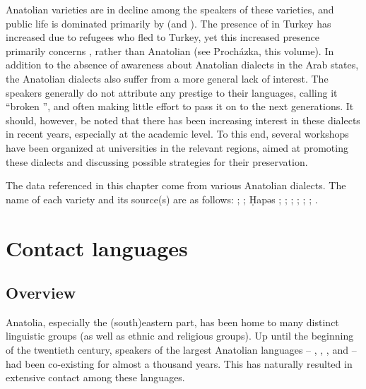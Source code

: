 \documentclass[output=paper]{langsci/langscibook}
\begin{document}
Anatolian  varieties are in decline among the speakers of these varieties, and public life is dominated primarily by  (and ). The presence of  in Turkey has increased due to  refugees who fled to Turkey, yet this increased presence primarily concerns  , rather than Anatolian  (see Proch\'{a}zka, this volume). In addition to the absence of awareness about Anatolian  dialects in the Arab states, the Anatolian dialects also suffer from a more general lack of interest. The speakers generally do not attribute any {prestige} to their languages, calling it ``broken '', and often making little effort to pass it on to the next generations. It should, however, be noted that there has been increasing interest in these dialects in recent years, especially at the academic level. To this end, several workshops have been organized at universities in the relevant regions, aimed at promoting these dialects and discussing possible strategies for their preservation.

The data referenced in this chapter come from various Anatolian  dialects. The name of each variety and its source(s) are as follows:  \citep{Wittrich2001};  \citep{Jastrow1973}; \d{H}apəs \citep{Talay2007};  \citep{Talay2001,Talay2002};  \citep{Jastrow1978};    \citep{Jastrow2006,Grigore2007article,GrigoreBituna2012};  \citep{Akkus2016,Akkus2017,Isaksson2005};  \citep{Bituna2016,GrigoreBituna2012};  \citep{Lahdo2009}.

\section{Contact languages}

\subsection{Overview}
{Anatolia}, especially the (south)eastern part, has been home to many distinct linguistic groups (as well as ethnic and religious groups). Up until the beginning of the twentieth century, speakers of the largest Anatolian languages -- , , ,  and  -- had been co-existing for almost a thousand years. This has naturally resulted in extensive contact among these languages.
\end{document}
